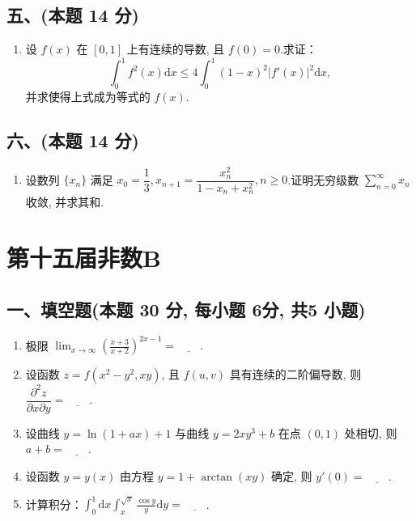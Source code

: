 \subsection*{五、(本题 14 分)}
\begin{enumerate}[start=9]
    \item 设 $f(x)$ 在 $[0,1]$ 上有连续的导数, 且 $f(0) = 0$.求证：
          \[ \int_{0}^{1} f^2(x) \mathrm{d}x \leq 4 \int_{0}^{1} (1 - x)^2 |f'(x)|^2 \mathrm{d}x, \]
          并求使得上式成为等式的 $f(x)$.
\end{enumerate}

\subsection*{六、(本题 14 分)}
\begin{enumerate}[start=10]
    \item 设数列 $\{x_n\}$ 满足 $x_0 = \dfrac{1}{3}, x_{n+1} = \dfrac{x_n^2}{1 - x_n + x_n^2}, n \geq 0$.证明无穷级数 $\displaystyle\sum_{n=0}^{\infty} x_n$ 收敛, 并求其和.
\end{enumerate}


\newpage
\section{第十五届非数B}

\subsection*{一、填空题(本题 30 分,  每小题 6分,  共5 小题)}
\begin{enumerate}
    \item 极限 $\displaystyle \lim_{x \to \infty} \left( \frac{x + 3}{x + 2} \right)^{2x - 1} = \underline{\quad\quad}. $
    \item 设函数 $z = f(x^2 - y^2, xy)$, 且 $f(u, v)$ 具有连续的二阶偏导数, 则 $ \dfrac{\partial^2 z}{\partial x \partial y} = \underline{\quad\quad} $.
    \item 设曲线 $y = \ln(1 + ax) + 1$ 与曲线 $y = 2xy^3 + b$ 在点 $(0, 1)$ 处相切, 则 $a + b = \underline{\quad\quad} $.
    \item 设函数 $y = y(x)$ 由方程 $y = 1 + \arctan(xy)$ 确定, 则 $y'(0) = \underline{\quad\quad} $.
    \item 计算积分：$\displaystyle \int_0^1 \mathrm{d}x \int_x^{\sqrt{x}} \frac{\cos y}{y} \mathrm{d}y = \underline{\quad\quad} $.
\end{enumerate}

